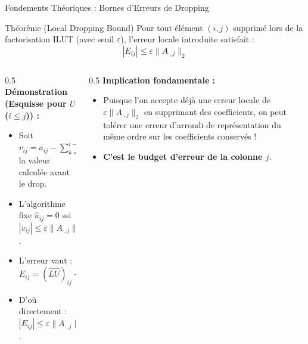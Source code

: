 \documentclass[10pt,aspectratio=169]{beamer}
\begin{document}
\begin{frame}{Fondements Théoriques : Bornes d'Erreurs de Dropping}
    \begin{block}{Théorème (Local Dropping Bound)}
        Pour tout élément $(i,j)$ supprimé lors de la factorisation ILUT (avec seuil $\varepsilon$), l'erreur locale introduite satisfait :
        $$|E_{ij}| \le \varepsilon \|A_{\cdot,j}\|_2$$
    \end{block}
    
    \vspace{0.2cm}
    \begin{columns}
        \begin{column}{0.5\textwidth}
            \textbf{Démonstration (Esquisse pour $U$ ($i \le j$)) :}
            \begin{itemize}
                \item Soit $v_{ij} = a_{ij} - \sum_{k=1}^{i-1} \hat{l}_{ik}\hat{u}_{kj}$ la valeur calculée avant le drop.
                \item L'algorithme fixe $\hat{u}_{ij} = 0$ ssi $|v_{ij}| \le \varepsilon\|A_{\cdot,j}\|_2$.
                \item L'erreur vaut :
                $$E_{ij} = (\hat{L}\hat{U})_{ij} - a_{ij} = -v_{ij}$$
                \item D'où directement : $|E_{ij}| \le \varepsilon\|A_{\cdot,j}\|_2$.
            \end{itemize}
        \end{column}
        
        \begin{column}{0.5\textwidth}
            \textbf{Implication fondamentale :}
            \begin{itemize}
                \item Puisque l'on accepte déjà une erreur locale de $\varepsilon\|A_{\cdot,j}\|_2$ en supprimant des coefficients, on peut tolérer une erreur d'arrondi de représentation du même ordre sur les coefficients conservés !
                \item \textbf{C'est le budget d'erreur de la colonne $j$}.
            \end{itemize}
        \end{column}
    \end{columns}
\end{frame}
\end{document}
